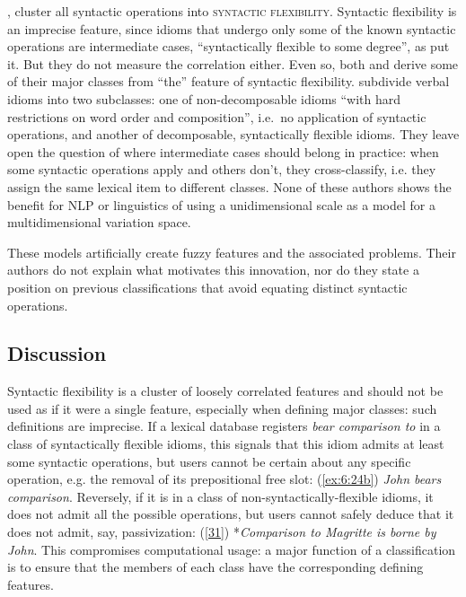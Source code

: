 \documentclass[output=paper]{langsci/langscibook}
\begin{document}
\citet[6]{Sag:2002}, \citet[278]{Baldwin2010} cluster all syntactic operations into \textsc{syntactic flexibility}. Syntactic flexibility is an imprecise feature, since idioms that undergo only some of the known syntactic operations are intermediate cases, “syntactically flexible to some degree”, as \cite{Sag:2002} put it. But they do not measure the correlation either. Even so, both \cite[3]{Sag:2002}  and \citet[279]{Baldwin2010} derive some of their major classes from “the” feature of syntactic flexibility. \cite{Baldwin2010}  subdivide verbal idioms into two subclasses: one of non-decomposable idioms “with hard restrictions on word order and composition”, i.e.~no application of syntactic operations, and another of decomposable, syntactically flexible idioms. They leave open the question of where intermediate cases should belong in practice: when some syntactic operations apply and others don’t, they cross-classify, i.e. they assign the same lexical item to different classes. None of these authors shows the benefit for NLP or linguistics of using a unidimensional scale as a model for a multidimensional variation space.

These models artificially create fuzzy features and the associated problems. Their authors do not explain what motivates this innovation, nor do they state a position on previous classifications that avoid equating distinct syntactic operations.

\subsection{Discussion}
\label{syntacticflexibility}

Syntactic flexibility is a cluster of loosely correlated features and should not be used as if it were a single feature, especially when defining major classes: such definitions are imprecise. If a lexical database registers \textit{bear comparison to} in a class of syntactically flexible idioms, this signals that this idiom admits at least some syntactic operations, but users cannot be certain about any specific operation, e.g. the removal of its prepositional free slot: (\ref{ex:6:24b}) \textit{John bears comparison}. Reversely, if it is in a class of non-syntactically-flexible idioms, it does not admit all the possible operations, but users cannot safely deduce that it does not admit, say, passivization: (\ref{31}) *\textit{Comparison to Magritte is borne by John}. This compromises computational usage: a major function of a classification is to ensure that the members of each class have the corresponding defining features.
\end{document}
